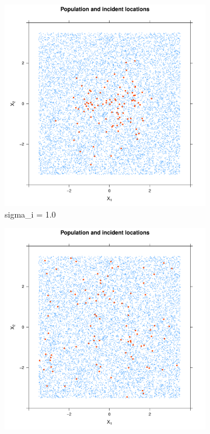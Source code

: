 \begin{figure}[htbp]
    \centering
    \begin{subfigure}{0.45\textwidth}
        \includegraphics[width=\textwidth]{results/unif_100_1.0_1h/output/population_and_incidents_scatter}
        \caption{\gls{sigma_i} = 1.0}
    \end{subfigure}
    \begin{subfigure}{0.45\textwidth}
        \includegraphics[width=\textwidth]{results/unif_100_2.8_1h/output/population_and_incidents_scatter}

\end{subfigure}
\end{figure}
